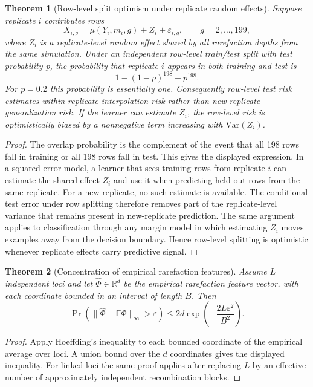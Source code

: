 \documentclass[11pt]{article}
\theoremstyle{plain}
\newtheorem{thm}{Theorem}[section]
\theoremstyle{definition}
\theoremstyle{remark}
\begin{document}
\begin{thm}[Row-level split optimism under replicate random effects]\label{thm:leakage}
Suppose replicate \(i\) contributes rows
\[
X_{i,g}=\mu(Y_i,m_i,g)+Z_i+\varepsilon_{i,g},\qquad g=2,\ldots,199,
\]
where \(Z_i\) is a replicate-level random effect shared by all rarefaction depths from the
same simulation. Under an independent row-level train/test split with test probability
p, the probability that replicate \(i\) appears in both training and test is
\[
1-(1-p)^{198}-p^{198}.
\]
For \(p=0.2\) this probability is essentially one. Consequently row-level test risk
estimates within-replicate interpolation risk rather than new-replicate generalization
risk. If the learner can estimate \(Z_i\), the row-level risk is optimistically biased by
a nonnegative term increasing with \(\mathrm{Var}(Z_i)\).
\end{thm}

\begin{proof}
The overlap probability is the complement of the event that all 198 rows fall in training
or all 198 rows fall in test. This gives the displayed expression. In a squared-error
model, a learner that sees training rows from replicate \(i\) can estimate the shared
effect \(Z_i\) and use it when predicting held-out rows from the same replicate. For a new
replicate, no such estimate is available. The conditional test error under row splitting
therefore removes part of the replicate-level variance that remains present in
new-replicate prediction. The same argument applies to classification through any margin
model in which estimating \(Z_i\) moves examples away from the decision boundary. Hence
row-level splitting is optimistic whenever replicate effects carry predictive signal.
\end{proof}

\begin{thm}[Concentration of empirical rarefaction features]
Assume \(L\) independent loci and let \(\widehat{\Phi}\in\mathbb{R}^d\) be the empirical
rarefaction feature vector, with each coordinate bounded in an interval of length \(B\).
Then
\[
\Pr\left(\|\widehat{\Phi}-\mathbb{E}\Phi\|_\infty>\varepsilon\right)
\le 2d\exp\left(-\frac{2L\varepsilon^2}{B^2}\right).
\]
\end{thm}

\begin{proof}
Apply Hoeffding's inequality to each bounded coordinate of the empirical average over
loci. A union bound over the \(d\) coordinates gives the displayed inequality. For linked
loci the same proof applies after replacing \(L\) by an effective number of approximately
independent recombination blocks.
\end{proof}
\end{document}

